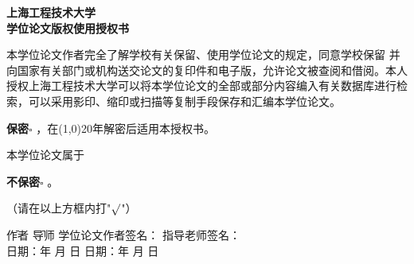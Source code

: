 
\begin{titlepage}
    
\begin{center}\heiti\sanhao\textbf{
    上海工程技术大学 \\
    学位论文版权使用授权书}
\end{center}

本学位论文作者完全了解学校有关保留、使用学位论文的规定，同意学校保留
并向国家有关部门或机构送交论文的复印件和电子版，允许论文被查阅和借阅。本人
授权上海工程技术大学可以将本学位论文的全部或部分内容编入有关数据库进行检
索，可以采用影印、缩印或扫描等复制手段保存和汇编本学位论文。

\hspace{7em}\textbf{保密}$\square$ ，在\line(1,0){20}年解密后适用本授权书。

本学位论文属于

\hspace{7em}\textbf{不保密}$\square$ 。

（请在以上方框内打\quad "\emph{$\surd$}"）

\vspace{15em}
\begin{tabbing}
    \qquad \= 作者 \hspace{15em} \= 导师 \kill
    \> 学位论文作者签名： \> 指导老师签名： \\
    \> 日期：\qquad 年 \qquad 月 \qquad 日 \> 日期：\qquad 年 \qquad 月 \qquad 日
\end{tabbing}  

\end{titlepage}

